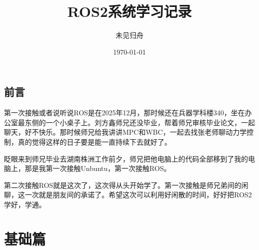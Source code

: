 \documentclass[12pt,a4paper]{ctexbook}
\title{ROS2系统学习记录}
\author{未见归舟}
\date{\today}
\begin{document}
\frontmatter
\maketitle

\tableofcontents

\chapter*{前言}
第一次接触或者说听说ROS是在2025年12月，那时候还在兵器学科楼340，坐在办公室最东侧的一个小桌子上。刘方鑫师兄还没毕业，帮着师兄审核毕业论文，一起聊天，好不快乐。那时候师兄给我讲讲MPC和WBC，一起去找张老师聊动力学控制，真的觉得这样的日子要是能一直持续下去就好了。

眨眼来到师兄毕业去湖南株洲工作前夕，师兄把他电脑上的代码全部移到了我的电脑上，那是我第一次接触Unbuntu，第一次接触ROS。

第二次接触ROS就是这次了，这次得从头开始学了。第一次接触是师兄弟间的闲聊，这一次就是朋友间的承诺了。希望这次可以利用好闲散的时间，好好把ROS2学好，学通。

\mainmatter

\part{基础篇}






% 
\end{document}
